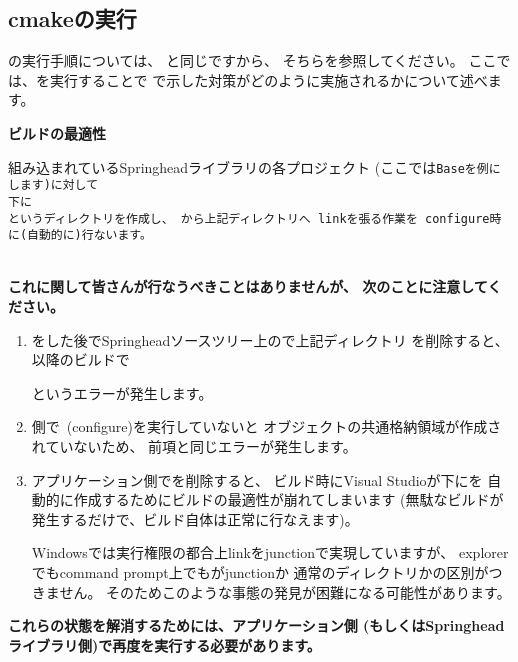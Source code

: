 \subsection{cmakeの実行}
\label{subsec:CmakeApplication}

\noindent
\cmake の実行手順については、
と同じですから、
そちらを参照してください。
ここでは、\cmake を実行することで
で示した対策がどのように実施されるかについて述べます。

\bigskip
\noindent
\bf{ビルドの最適性}
\begin{narrow}[20pt]
	組み込まれているSpringheadライブラリの各プロジェクト
	(ここでは\tt{Base}を例にします)に対して\\
	\hspace{20pt}下に
	\\
	というディレクトリを作成し、
	から上記ディレクトリへ
	linkを張る作業を\cmake\ configure時に(自動的に)行ないます。
\end{narrow}	
\begin{narrow}[20pt]
	\thinrule{\linewidth}\\
	{\bf{これに関して皆さんが行なうべきことはありませんが、
	次のことに注意してください。}}

	\medskip
	\begin{enumerate}
	  \item	\cmake をした後でSpringheadソースツリー上ので上記ディレクトリ
		を削除すると、以降のビルドで\\
		\hspace{15pt}

		というエラーが発生します。

	  \item	\SprLib 側で\cmake\ (configure)を実行していないと
		オブジェクトの共通格納領域が作成されていないため、
		前項と同じエラーが発生します。

	  \item	アプリケーション側でを削除すると、
		ビルド時にVisual Studioが\build 下にを
		自動的に作成するためにビルドの最適性が崩れてしまいます
		(無駄なビルドが発生するだけで、ビルド自体は正常に行なえます)。
		\begin{narrow}[s][15pt]
		Windowsでは実行権限の都合上linkをjunctionで実現していますが、
		explorerでもcommand prompt上でもがjunctionか
		通常のディレクトリかの区別がつきません。
		そのためこのような事態の発見が困難になる可能性があります。
		\end{narrow}
	\end{enumerate}
	\medskip
	{\bf{これらの状態を解消するためには、アプリケーション側
	(もしくはSpringheadライブラリ側)で再度\cmake を実行する必要があります。}}

	\thinrule{\linewidth}
\end{narrow}
